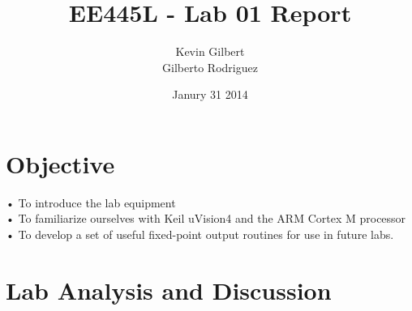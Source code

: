 \documentclass[11pt]{article}
\title{EE445L - Lab 01 Report}
\author{Kevin Gilbert\\ Gilberto Rodriguez}
\date{Janury 31 2014}
\begin{document}
\maketitle{}

\section*{Objective}
  • To introduce the lab equipment\\
  • To familiarize ourselves with Keil uVision4 and the ARM Cortex M processor\\
  • To develop a set of useful fixed-point output routines for use in future labs.

\section*{Lab Analysis and Discussion}
\end{document}
